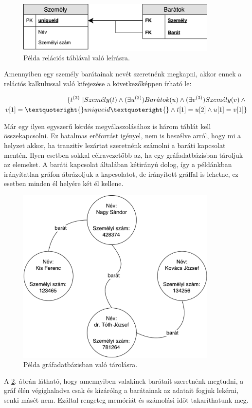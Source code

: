 \begin{figure}[H]
	\centering
	\includegraphics[width=100mm]{figures/RelaciosPelda.pdf}
	\caption{Példa relációs táblával való leírásra.}
	\label{fig:relaciosPelda}
\end{figure}

Amennyiben egy személy barátainak nevét szeretnénk megkapni, akkor ennek a relációs kalkulussal való kifejezése a következőképpen írható le:

\begin{equation}
\begin{split}
\{t^{(3)}\ | Szem\acute{e}ly(t) \wedge{} (\exists{}u^{(2)})Bar\acute{a}tok(u) \wedge{} (\exists{}v^{(3)})Szem\acute{e}ly(v) \wedge{} \\ v[1] = \textquoteright{}uniqueid\textquoteright{} \wedge{} 
t[1]=u[2] \wedge{}u[1]=v[1]      \}
\end{split}
\end{equation}

Már egy ilyen egyszerű kérdés megválaszolásához is három táblát kell összekapcsolni. Ez hatalmas erőforrást igényel, nem is beszélve arról, hogy mi a helyzet akkor, ha tranzitív lezártat szeretnénk számolni a baráti kapcsolat mentén. Ilyen esetben sokkal célravezetőbb az, ha egy gráfadatbázisban tároljuk az elemeket. A baráti kapcsolat általában kétirányú dolog, így a példánkban irányítatlan gráfon ábrázoljuk a kapcsolatot, de irányított gráffal is lehetne, ez esetben minden él helyére két él kellene.

\begin{figure}[H]
	\centering
	\includegraphics[width=100mm]{figures/GrafadatbazisPelda.pdf}
	\caption{Példa gráfadatbázisban való tárolásra.}
	\label{fig:grafPelda}
\end{figure}

A \ref{fig:grafPelda}. ábrán látható, hogy amennyiben valakinek barátait szeretnénk megtudni, a gráf élén végighaladva csak és kizárólag a barátainak az adatait fogjuk lekérni, senki másét nem. Ezáltal rengeteg memóriát és számolási időt takaríthatunk meg.